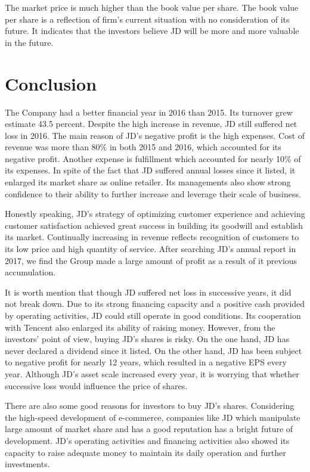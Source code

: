 The market price is much higher than the book value per share. The book value per share is a reflection of firm’s current situation with no consideration of its future. It indicates that the investors believe JD will be more and more valuable in the future.

\section{Conclusion}
The Company had a better financial year in 2016 than 2015. Its turnover grew estimate 43.5 percent. Despite the high increase in revenue, JD still suffered net loss in 2016. The main reason of JD’s negative profit is the high expenses. Cost of revenue was more than 80\% in both 2015 and 2016, which accounted for its negative profit. Another expense is fulfillment which accounted for nearly 10\% of its expenses. In spite of the fact that JD suffered annual losses since it listed, it enlarged its market share as online retailer. Its managements also show strong confidence to their ability to further increase and leverage their scale of business.

Honestly speaking, JD’s strategy of optimizing customer experience and achieving customer satisfaction achieved great success in building its goodwill and establish its market. Continually increasing in revenue reflects recognition of customers to its low price and high quantity of service. After searching JD’s annual report in 2017, we find the Group made a large amount of profit as a result of it previous accumulation.

It is worth mention that though JD suffered net loss in successive years, it did not break down. Due to its strong financing capacity and a positive cash provided by operating activities, JD could still operate in good conditions. Its cooperation with Tencent also enlarged its ability of raising money.
However, from the investors’ point of view, buying JD’s shares is risky. On the one hand, JD has never declared a dividend since it listed. On the other hand, JD has been subject to negative profit for nearly 12 years, which resulted in a negative EPS every year. Although JD’s asset scale increased every year, it is worrying that whether successive loss would influence the price of shares.

There are also some good reasons for investors to buy JD’s shares. Considering the high-speed development of e-commerce, companies like JD which manipulate large amount of market share and has a good reputation has a bright future of development. JD’s operating activities and financing activities also showed its capacity to raise adequate money to maintain its daily operation and further investments.

